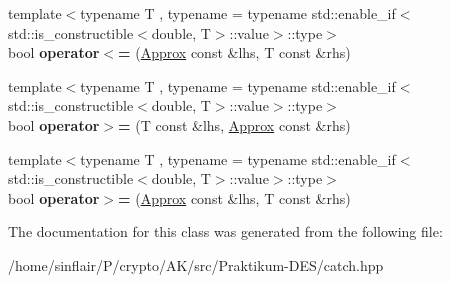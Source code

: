 \begin{DoxyCompactItemize}
\item 
\mbox{\label{classCatch_1_1Detail_1_1Approx_a6040b908588745570847d7ae8483b091}} 
{\footnotesize template$<$typename T , typename  = typename std\+::enable\+\_\+if$<$std\+::is\+\_\+constructible$<$double, T$>$\+::value$>$\+::type$>$ }\\bool {\bfseries operator$<$=} (\hyperlink{classCatch_1_1Detail_1_1Approx}{Approx} const \&lhs, T const \&rhs)
\item 
\mbox{\label{classCatch_1_1Detail_1_1Approx_affd27efc62be386daeecb7a09e828d44}} 
{\footnotesize template$<$typename T , typename  = typename std\+::enable\+\_\+if$<$std\+::is\+\_\+constructible$<$double, T$>$\+::value$>$\+::type$>$ }\\bool {\bfseries operator$>$=} (T const \&lhs, \hyperlink{classCatch_1_1Detail_1_1Approx}{Approx} const \&rhs)
\item 
\mbox{\label{classCatch_1_1Detail_1_1Approx_a5899b8a36725406701e2ebded2971ee6}} 
{\footnotesize template$<$typename T , typename  = typename std\+::enable\+\_\+if$<$std\+::is\+\_\+constructible$<$double, T$>$\+::value$>$\+::type$>$ }\\bool {\bfseries operator$>$=} (\hyperlink{classCatch_1_1Detail_1_1Approx}{Approx} const \&lhs, T const \&rhs)
\end{DoxyCompactItemize}


The documentation for this class was generated from the following file\+:\begin{DoxyCompactItemize}
\item 
/home/sinflair/\+P/crypto/\+A\+K/src/\+Praktikum-\/\+D\+E\+S/catch.\+hpp\end{DoxyCompactItemize}

